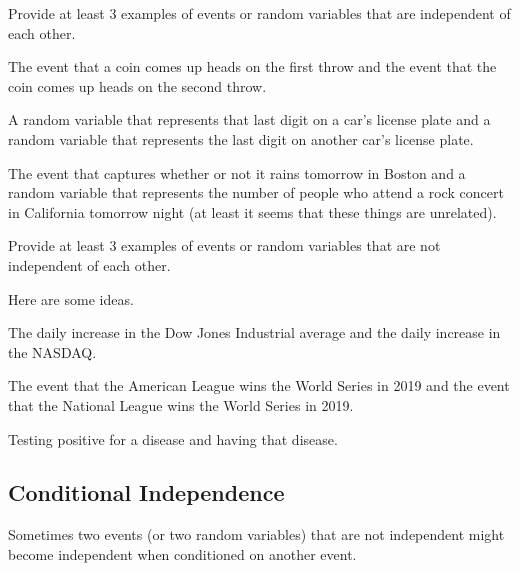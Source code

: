 \documentclass[assignment02_Solutions]{subfiles}
\begin{document}
\begin{exercise}[(10 minutes)]
\bes
\item Provide at least 3 examples of events or random variables that are independent of each other.

\begin{boxedsolution}
\bi
\item The event that a coin comes up heads on the first throw and the event that the coin comes up heads on the second throw.
\item A random variable that represents that last digit on a car's license plate and a random variable that represents the last digit on another car's license plate.
\item The event that captures whether or not it rains tomorrow in Boston and a random variable that represents the number of people who attend a rock concert in California tomorrow night (at least it seems that these things are unrelated).
\ei
\end{boxedsolution}

\item Provide at least 3 examples of events or random variables that are not independent of each other.

\begin{boxedsolution}
Here are some ideas.
\bi
\item The daily increase in the Dow Jones Industrial average and the daily increase in the NASDAQ.
\item The event that the American League wins the World Series in 2019 and the event that the National League wins the World Series in 2019.
\item Testing positive for a disease and having that disease.
\ei
\end{boxedsolution}

\ees
\end{exercise}

\subsection{Conditional Independence}
Sometimes two events (or two random variables) that are not independent might become independent when conditioned on another event.
\end{document}
